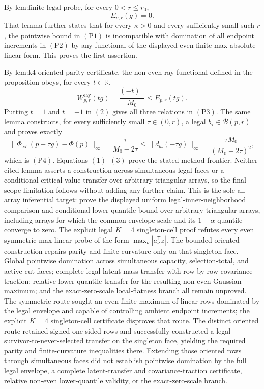 By \(\text{lem:finite-legal-probe}\), for every \(0<r\le r_0\),
\[
 E_{p,r}(g)=0.
\tag{1}
\]
That lemma further states that for every \(\kappa>0\) and every sufficiently small such \(r\), the pointwise bound in \((\mathrm{P1})\) is incompatible with domination of all endpoint increments in \((\mathrm{P2})\) by any functional of the displayed even finite max-absolute-linear form.  This proves the first assertion.

By \(\text{lem:k4-oriented-parity-certificate}\), the non-even ray functional defined in the proposition obeys, for every \(t\in\mathbb R\),
\[
 W^{\mathrm{ray}}_{p,r}(tg)=\frac{(-t)_+}{M_0}
 \le E_{p,r}(tg).
\tag{2}
\]
Putting \(t=1\) and \(t=-1\) in \((2)\) gives all three relations in \((\mathrm{P3})\).  The same lemma constructs, for every sufficiently small \(\tau\in(0,r)\), a legal \(b_\tau\in\mathcal B(p,r)\) and proves exactly
\[
 \|\Phi_{\mathrm{ext}}(p-\tau g)-\Phi(p)\|_\infty
 =\frac{\tau}{M_0-2\tau}
 \le\|d_{b_\tau}(-\tau g)\|_\infty
 =\frac{\tau M_0}{(M_0-2\tau)^2},
\tag{3}
\]
which is \((\mathrm{P4})\).  Equations \((1)\)--\((3)\) prove the stated method frontier.  Neither cited lemma asserts a construction across simultaneous legal faces or a conditional critical-value transfer over arbitrary triangular arrays, so the final scope limitation follows without adding any further claim.
This is the sole all-array inferential target: prove the displayed uniform legal-inner-neighborhood comparison and conditional lower-quantile bound over arbitrary triangular arrays, including arrays for which the common envelope scale and its \(1-\alpha\) quantile converge to zero.
The explicit legal \(K=4\) singleton-cell proof refutes every even symmetric max-linear probe of the form \(\max_\nu|a_\nu^{\mathsf T}z|\).  The bounded oriented construction repairs parity and finite curvature only on that singleton face.  Global pointwise domination across simultaneous capacity, selection-total, and active-cut faces; complete legal latent-mass transfer with row-by-row covariance traction; relative lower-quantile transfer for the resulting non-even Gaussian maximum; and the exact-zero-scale local-flatness branch all remain unproved.
The symmetric route sought an even finite maximum of linear rows dominated by the legal envelope and capable of controlling ambient endpoint increments; the explicit \(K=4\) singleton-cell certificate disproves that route.  The distinct oriented route retained signed one-sided rows and successfully constructed a legal survivor-to-never-selected transfer on the singleton face, yielding the required parity and finite-curvature inequalities there.  Extending those oriented rows through simultaneous faces did not establish pointwise domination by the full legal envelope, a complete latent-transfer and covariance-traction certificate, relative non-even lower-quantile validity, or the exact-zero-scale branch.
